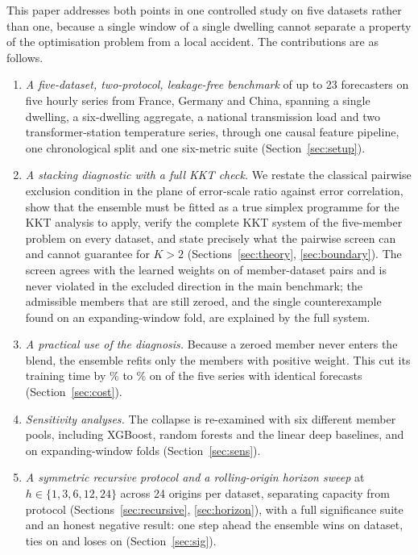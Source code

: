 \documentclass[journal]{IEEEtran}
\begin{document}
This paper addresses both points in one controlled study on five datasets rather than one, because a single window of a single dwelling cannot separate a property of the optimisation problem from a local accident. The contributions are as follows.
\begin{enumerate}
\item \emph{A five-dataset, two-protocol, leakage-free benchmark} of up to 23 forecasters on five hourly series from France, Germany and China, spanning a single dwelling, a six-dwelling aggregate, a national transmission load and two transformer-station temperature series, through one causal feature pipeline, one chronological split and one six-metric suite (Section~\ref{sec:setup}).
\item \emph{A stacking diagnostic with a full KKT check.} We restate the classical pairwise exclusion condition in the plane of error-scale ratio against error correlation, show that the ensemble must be fitted as a true simplex programme for the KKT analysis to apply, verify the complete KKT system of the five-member problem on every dataset, and state precisely what the pairwise screen can and cannot guarantee for $K > 2$ (Sections~\ref{sec:theory}, \ref{sec:boundary}). The screen agrees with the learned weights on \nAgree{} of \nNonLeading{} member-dataset pairs and is never violated in the excluded direction in the main benchmark; the \nAdmZero{} admissible members that are still zeroed, and the single counterexample found on an expanding-window fold, are explained by the full system.
\item \emph{A practical use of the diagnosis.} Because a zeroed member never enters the blend, the ensemble refits only the members with positive weight. This cut its training time by \% to \% on \nRefitSavedWord{} of the five series with identical forecasts (Section~\ref{sec:cost}).
\item \emph{Sensitivity analyses.} The collapse is re-examined with six different member pools, including XGBoost, random forests and the linear deep baselines, and on expanding-window folds (Section~\ref{sec:sens}).
\item \emph{A symmetric recursive protocol and a rolling-origin horizon sweep} at $h \in \{1,3,6,12,24\}$ across 24 origins per dataset, separating capacity from protocol (Sections~\ref{sec:recursive}, \ref{sec:horizon}), with a full significance suite and an honest negative result: one step ahead the ensemble wins on \nWinsOne{} dataset, ties on \nTiesOne{} and loses on \nLossOne{} (Section~\ref{sec:sig}).
\end{enumerate}
\end{document}

